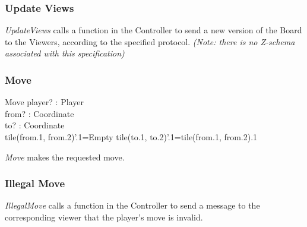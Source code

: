 \documentclass[a4paper,twoside,11pt]{book}
\begin{document}

\subsubsection{Update Views} %
\label{ssub:update_views}

\emph{UpdateViews} calls a function in the Controller to send a new version of the Board to the Viewers, according to the specified protocol. \emph{(Note: there is no Z-schema associated with this specification)}


\subsubsection{Move} %
\label{ssub:move}

\begin{schema}{Move}
    player? : Player\\
    from? : Coordinate\\
    to? : Coordinate\\
\ST
tile(from.1, from.2)'.1=Empty \wedge tile(to.1, to.2)'.1=tile(from.1, from.2).1 \\
\end{schema}
\emph{Move} makes the requested move.


\subsubsection{Illegal Move} %
\label{ssub:illegal_move}
\emph{IllegalMove} calls a function in the Controller to send a message to the corresponding viewer that the player's move is invalid.
\end{document}
